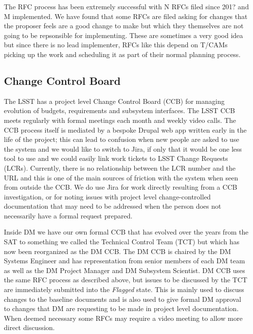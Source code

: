 The RFC process has been extremely successful with N RFCs filed since 201? and M implemented.
We have found that some RFCs are filed asking for changes that the proposer feels are a good change to make but which they themselves are not going to be repsonsible for implementing.
These are sometimes a very good idea but since there is no lead implementer, RFCs like this depend on T/CAMs picking up the work and scheduling it as part of their normal planning process.

\subsection{Change Control Board}

The LSST has a project level Change Control Board (CCB) for managing evolution of budgets, requirements and subsystem interfaces.
The LSST CCB meets regularly with formal meetings each month and weekly video calls.
The CCB process itself is mediated by a bespoke Drupal web app written early in the life of the project; this can lead to confusion when new people are asked to use the system and we would like to switch to Jira, if only that it would be one less tool to use and we could easily link work tickets to LSST Change Requests (LCRs).
Currently, there is no relationship between the LCR number and the URL and this is one of the main sources of friction with the system when seen from outside the CCB.
We do use Jira for work directly resulting from a CCB investigation, or for noting issues with project level change-controlled documentation that may need to be addressed when the person does not necessarily have a formal request prepared.

Inside DM we have our own formal CCB that has evolved over the years from the SAT to something we called the Technical Control Team (TCT) but which has now been reorganized as the DM CCB.
The DM CCB is chaired by the DM Systems Engineer and has representation from senior members of each DM team as well as the DM Project Manager and DM Subsystem Scientist.
DM CCB uses the same RFC process as described above, but issues to be discussed by the TCT are immediately submitted into the \emph{Flagged} state.
This is mainly used to discuss changes to the baseline documents and is also used to give formal DM approval to changes that DM are requesting to be made in project level documentation.
When deemed necessary some RFCs may require a video meeting to allow more direct discussion.
